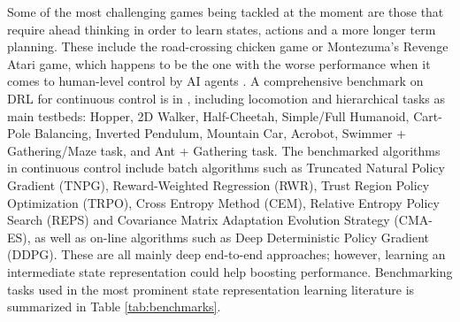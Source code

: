 \documentclass[a4paper]{article}
\begin{document}
Some of the most challenging games being tackled at the moment are those that require ahead thinking in order to learn states, actions and a more longer term planning. These include the road-crossing chicken game \cite{Machado17a} or Montezuma's Revenge Atari game, which happens to be the one with the worse performance when it comes to human-level control by AI agents \cite{Mnih15}. A comprehensive benchmark on DRL for continuous control is in \cite{Duan16}, including locomotion and hierarchical tasks as main testbeds: Hopper, 2D Walker, Half-Cheetah, Simple/Full Humanoid, Cart-Pole Balancing, Inverted Pendulum, Mountain Car, Acrobot, Swimmer + Gathering/Maze task, and Ant + Gathering task. The benchmarked algorithms in continuous control include batch algorithms such as Truncated Natural Policy Gradient (TNPG), Reward-Weighted Regression (RWR), Trust Region Policy Optimization (TRPO), Cross Entropy Method (CEM), Relative Entropy Policy Search (REPS) and Covariance Matrix Adaptation Evolution Strategy (CMA-ES), as well as on-line algorithms such as Deep Deterministic Policy Gradient (DDPG). These are all mainly  deep end-to-end approaches; however, learning an intermediate state representation could help boosting performance. Benchmarking tasks used in the most prominent state representation learning literature is summarized in Table \ref{tab:benchmarks}.
\end{document}
